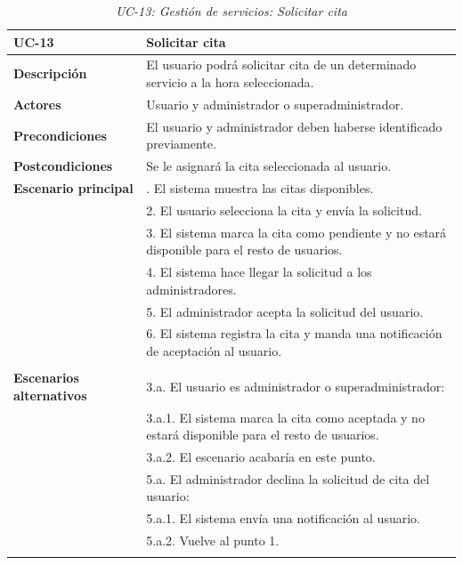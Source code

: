 \begin{table}
  \begin{center}
    \begin{tabularx}{16.4cm}{|l|X|}
      \hline
      \textbf{UC-13} & \textbf{Solicitar cita}\\
      \hline
      \textbf{Descripción} & El usuario podrá solicitar cita de un determinado servicio a la hora seleccionada.\\
      \hline
      \textbf{Actores} & Usuario y administrador o superadministrador.\\
      \hline
      \textbf{Precondiciones} & El usuario y administrador deben haberse identificado previamente.\\
      \hline
      \textbf{Postcondiciones} & Se le asignará la cita seleccionada al usuario.\\
      \hline
      \textbf{Escenario principal} & \smallskip 1. El sistema muestra las citas disponibles.\\
      & 2. El usuario selecciona la cita y envía la solicitud.\\
      & 3. El sistema marca la cita como pendiente y no estará disponible para el resto de usuarios. \\
      & 4. El sistema hace llegar la solicitud a los administradores.\\
      & 5. El administrador acepta la solicitud del usuario.\\
      & 6. El sistema registra la cita y manda una notificación de aceptación al usuario.\\
      & \\
      \hline
      \textbf{Escenarios alternativos} & \smallskip 3.a. El usuario es administrador o superadministrador:\\
      & \hspace{0.3cm} 3.a.1. El sistema marca la cita como aceptada y no estará disponible para el resto de usuarios. \\
      & \hspace{0.3cm} 3.a.2. El escenario acabaría en este punto.\\
      & \smallskip 5.a. El administrador declina la solicitud de cita del usuario:\\
      & \hspace{0.3cm} 5.a.1. El sistema envía una notificación al usuario.\\
      & \hspace{0.3cm} 5.a.2. Vuelve al punto 1.\\
      & \\
      \hline
    \end{tabularx}
    \caption{\textit{UC-13: Gestión de servicios: Solicitar cita}}
    \label{tab:CU-solicitar-cita}
  \end{center}
\end{table}



